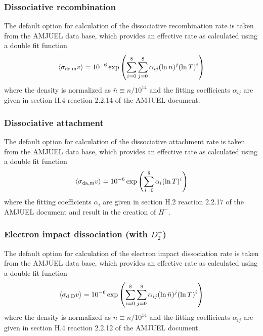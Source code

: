 \documentclass[amsmath,amssymb,a4]{revtex4-2}
\begin{document}
\subsubsection*{Dissociative recombination}
The default option for calculation of the dissociative recombination rate is taken from the AMJUEL data base, which provides an effective rate as calculated using a double fit function
\begin{equation}\label{dissociative_recombination}
    \langle\sigma_{\rm dr,m} v\rangle = 10^{-6} \exp\left( \sum_{i=0}^8\sum_{j=0}^8 \alpha_{ij} (\ln \bar n)^j (\ln T)^i \right)  %
\end{equation}
where the density is normalized as $\bar n \equiv n / 10^{14}$ and the fitting coefficients $\alpha_{ij}$ are given in section {H.4} reaction {2.2.14} of the AMJUEL document.

\subsubsection*{Dissociative attachment}
The default option for calculation of the dissociative attachment rate is taken from the AMJUEL data base, which provides an effective rate as calculated using a double fit function
\begin{equation}\label{dissociative_attachment}
    \langle\sigma_{\rm da,m} v\rangle = 10^{-6} \exp\left( \sum_{i=0}^8 \alpha_{i}  (\ln T)^i \right)  %
\end{equation}
where the fitting coefficients $\alpha_{i}$ are given in section {H.2} reaction {2.2.17} of the AMJUEL document and result in the creation of $H^{-}$.

\subsubsection*{Electron impact dissociation (with $D_2^+$)}
The default option for calculation of the electron impact dissociation rate is taken from the AMJUEL data base, which provides an effective rate as calculated using a double fit function
\begin{equation}\label{Electron impact dissociation}
    \langle\sigma_{\rm d,D} v\rangle = 10^{-6} \exp\left( \sum_{i=0}^8\sum_{j=0}^8 \alpha_{ij} (\ln \bar n)^j (\ln T)^i \right)  %
\end{equation}
where the density is normalized as $\bar n \equiv n / 10^{14}$ and the fitting coefficients $\alpha_{ij}$ are given in section {H.4} reaction {2.2.12} of the AMJUEL document.
\end{document}
